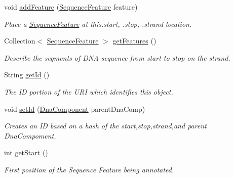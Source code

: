 \begin{DoxyCompactItemize}
\item 
void \hyperlink{classorg_1_1sbolstandard_1_1lib_s_b_o_lj_1_1_sequence_annotation_a8606f263fb4a3f3d9d7265cf1d1095d3}{addFeature} (\hyperlink{classorg_1_1sbolstandard_1_1lib_s_b_o_lj_1_1_sequence_feature}{SequenceFeature} feature)
\begin{DoxyCompactList}\small\item\em Place a \hyperlink{classorg_1_1sbolstandard_1_1lib_s_b_o_lj_1_1_sequence_feature}{SequenceFeature} at this.start, .stop, .strand location. \item\end{DoxyCompactList}\item 
Collection$<$ \hyperlink{classorg_1_1sbolstandard_1_1lib_s_b_o_lj_1_1_sequence_feature}{SequenceFeature} $>$ \hyperlink{classorg_1_1sbolstandard_1_1lib_s_b_o_lj_1_1_sequence_annotation_a6e4112a6cec45766efb5ce852f1e764e}{getFeatures} ()
\begin{DoxyCompactList}\small\item\em Describe the segments of DNA sequence from start to stop on the strand. \item\end{DoxyCompactList}\item 
String \hyperlink{classorg_1_1sbolstandard_1_1lib_s_b_o_lj_1_1_sequence_annotation_aab219518f0eaf3db55b6a62ad6b49407}{getId} ()
\begin{DoxyCompactList}\small\item\em The ID portion of the URI which identifies this object. \item\end{DoxyCompactList}\item 
void \hyperlink{classorg_1_1sbolstandard_1_1lib_s_b_o_lj_1_1_sequence_annotation_acc7f1b4283f0e5a9a502a64403d2e625}{setId} (\hyperlink{classorg_1_1sbolstandard_1_1lib_s_b_o_lj_1_1_dna_component}{DnaComponent} parentDnaComp)
\begin{DoxyCompactList}\small\item\em Creates an ID based on a hash of the start,stop,strand,and parent DnaCompoment. \item\end{DoxyCompactList}\item 
int \hyperlink{classorg_1_1sbolstandard_1_1lib_s_b_o_lj_1_1_sequence_annotation_a1408176a248f41dbe8735bd3009e0cf5}{getStart} ()
\begin{DoxyCompactList}\small\item\em First position of the Sequence Feature being annotated. \item\end{DoxyCompactList}\item 

\end{DoxyCompactItemize}
